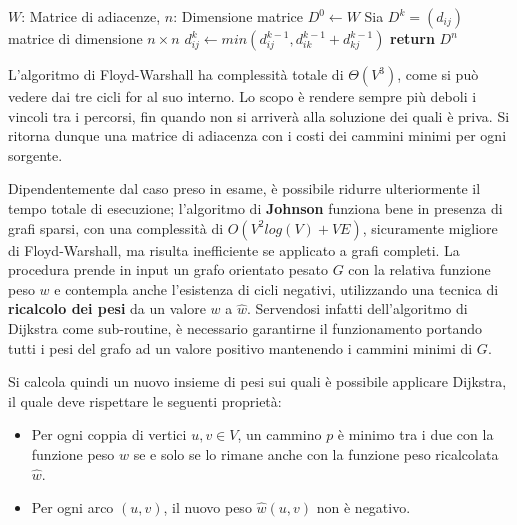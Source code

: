 \begin{algorithm}[h]
	\caption{floyd-warshall(W, n)}
	\begin{algorithmic}[i]
		\Require $W$: Matrice di adiacenze, $n$: Dimensione matrice
		\State $D^0\gets W$ 
		\State Sia $D^{k}=(d_{ij})$ matrice di dimensione $n\times n$
		\State $d_{ij}^k\gets min\left(d_{ij}^{k-1}, d_{ik}^{k-1} + d_{kj}^{k-1}\right)$ 
		\EndFor
		\EndFor
		\EndFor
		\State \textbf{return} $D^{n}$
	\end{algorithmic}
\end{algorithm}

\noindent L'algoritmo di Floyd-Warshall ha complessità totale di $\Theta(V^3)$, come si può vedere dai tre cicli for al suo interno. Lo scopo è rendere
sempre più deboli i vincoli tra i percorsi, fin quando non si arriverà alla soluzione dei quali è priva. Si ritorna dunque una matrice di adiacenza con
i costi dei cammini minimi per ogni sorgente.\par
Dipendentemente dal caso preso in esame, è possibile ridurre ulteriormente il tempo totale di esecuzione; l'algoritmo di \textbf{Johnson} funziona bene
in presenza di grafi sparsi, con una complessità di $O(V^2log(V) + VE)$, sicuramente migliore di Floyd-Warshall, ma risulta inefficiente se applicato
a grafi completi. La procedura prende in input un grafo orientato pesato $G$ con la relativa funzione peso $w$ e contempla anche l'esistenza di cicli
negativi, utilizzando una tecnica di \textbf{ricalcolo dei pesi} da un valore $w$ a $\hat{w}$. Servendosi infatti dell'algoritmo di Dijkstra come
sub-routine, è necessario garantirne il funzionamento portando tutti i pesi del grafo ad un valore positivo mantenendo i cammini minimi di $G$.\par
Si calcola quindi un nuovo insieme di pesi sui quali è possibile applicare Dijkstra, il quale deve rispettare le seguenti proprietà: \begin{itemize}
	\item Per ogni coppia di vertici $u,v\in V$, un cammino $p$ è minimo tra i due con la funzione peso $w$ se e solo se lo rimane anche con la funzione
	peso ricalcolata $\hat{w}$.
	\item Per ogni arco $(u,v)$, il nuovo peso $\hat{w}(u,v)$ non è negativo.
\end{itemize}


